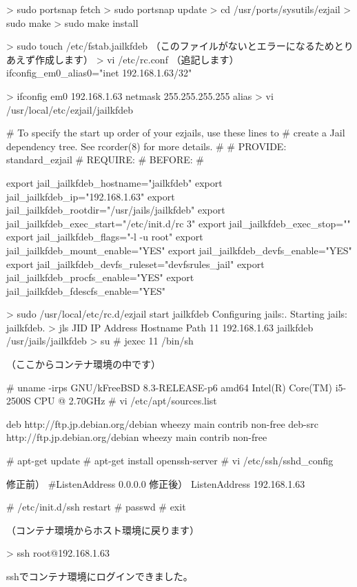 \documentclass[mingoth,a4paper]{jsarticle}
\begin{document}
\begin{commandline}
> sudo portsnap fetch
> sudo portsnap update
> cd /usr/ports/sysutils/ezjail
> sudo make
> sudo make install

> sudo touch /etc/fstab.jailkfdeb
  （このファイルがないとエラーになるためとりあえず作成します）
> vi /etc/rc.conf
（追記します）
ifconfig_em0_alias0="inet 192.168.1.63/32"

> ifconfig em0 192.168.1.63 netmask 255.255.255.255 alias
> vi /usr/local/etc/ezjail/jailkfdeb

# To specify the start up order of your ezjails, use these lines to
# create a Jail dependency tree. See rcorder(8) for more details.
#
# PROVIDE: standard_ezjail
# REQUIRE:
# BEFORE:
#

export jail_jailkfdeb_hostname="jailkfdeb"
export jail_jailkfdeb_ip="192.168.1.63"
export jail_jailkfdeb_rootdir="/usr/jails/jailkfdeb"
export jail_jailkfdeb_exec_start="/etc/init.d/rc 3"
export jail_jailkfdeb_exec_stop=""
export jail_jailkfdeb_flags="-l -u root"
export jail_jailkfdeb_mount_enable="YES"
export jail_jailkfdeb_devfs_enable="YES"
export jail_jailkfdeb_devfs_ruleset="devfsrules_jail"
export jail_jailkfdeb_procfs_enable="YES"
export jail_jailkfdeb_fdescfs_enable="YES"


> sudo /usr/local/etc/rc.d/ezjail start jailkfdeb
Configuring jails:.
Starting jails: jailkfdeb.
> jls
   JID  IP Address      Hostname                      Path
    11  192.168.1.63    jailkfdeb                     /usr/jails/jailkfdeb
> su
# jexec 11 /bin/sh

（ここからコンテナ環境の中です）

# uname -irps
GNU/kFreeBSD 8.3-RELEASE-p6 amd64 Intel(R) Core(TM) i5-2500S CPU @ 2.70GHz
# vi /etc/apt/sources.list

deb http://ftp.jp.debian.org/debian wheezy main contrib non-free
deb-src http://ftp.jp.debian.org/debian wheezy main contrib non-free

# apt-get update
# apt-get install openssh-server
# vi /etc/ssh/sshd_config

修正前）  #ListenAddress 0.0.0.0
修正後）  ListenAddress 192.168.1.63

# /etc/init.d/ssh restart
# passwd
# exit

（コンテナ環境からホスト環境に戻ります）

> ssh root@192.168.1.63 
\end{commandline}

sshでコンテナ環境にログインできました。
\end{document}
